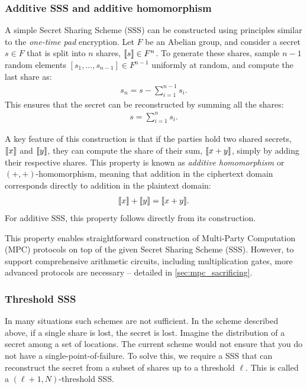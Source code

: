 \documentclass[11pt]{report}
\theoremstyle{definition}
\theoremstyle{plain}
\begin{document}
\subsubsection{Additive SSS and additive homomorphism}\label{sec:additive-sss}

A simple Secret Sharing Scheme (SSS) can be constructed using principles similar to the \textit{one-time pad} encryption. Let $F$ be an Abelian group, and consider a secret $s \in F$ that is split into $n$ shares, $\llbracket s \rrbracket \in F^n$. To generate these shares, sample $n-1$ random elements $[s_1, \dots, s_{n-1}] \in F^{n-1}$ uniformly at random, and compute the last share as:
\begin{align*}
  s_n = s - \sum_{i=1}^{n-1} s_i.
\end{align*}
This ensures that the secret can be reconstructed by summing all the shares:
\begin{align*}
  s = \sum_{i=1}^n s_i.
\end{align*}

A key feature of this construction is that if the parties hold two shared secrets, $\llbracket x \rrbracket$ and $\llbracket y \rrbracket$, they can compute the share of their sum, $\llbracket x + y \rrbracket$, simply by adding their respective shares. This property is known as \textit{additive homomorphism} or $(+, +)$-homomorphism, meaning that addition in the ciphertext domain corresponds directly to addition in the plaintext domain:
\begin{align*}
  \llbracket x \rrbracket + \llbracket y \rrbracket = \llbracket x + y \rrbracket.
\end{align*}
For additive SSS, this property follows directly from its construction.

This property enables straightforward construction of Multi-Party Computation (MPC) protocols on top of the given Secret Sharing Scheme (SSS)\@. However, to support comprehensive arithmetic circuits, including multiplication gates, more advanced protocols are necessary -- detailed in \autoref{sec:mpc_sacrificing}.

\subsubsection{Threshold SSS}\label{sub:threshold-sss}

In many situations such schemes are not sufficient. In the scheme described above, if a single share is lost, the secret is lost. Imagine the distribution of a secret among a set of locations. The current scheme would not ensure that you do not have a single-point-of-failure. To solve this, we require a SSS that can reconstruct the secret from a subset of shares up to a threshold $\ell$. This is called a $(\ell + 1, N)$-threshold SSS\@.
\end{document}
